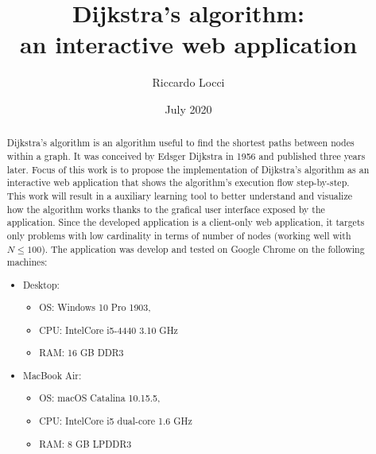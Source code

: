 \documentclass[9pt]{extarticle}
\title{Dijkstra's algorithm: \\ an interactive web application}
\date{July 2020}
\author{Riccardo Locci}
\begin{document}
    \maketitle
        
    \begin{abstract} 
        Dijkstra's algorithm is an algorithm useful to find the shortest paths between nodes within a graph. 
        It was conceived by Edsger Dijkstra in 1956 and published three years later.\cite{wiki:dijkstra} 
        Focus of this work is to propose the implementation of Dijkstra's algorithm as an interactive web application
        that shows the algorithm's execution flow step-by-step.
        This work will result in a auxiliary learning tool to better understand and visualize how the algorithm works
        thanks to the grafical user interface exposed by the application.
        Since the developed application is a client-only web application, it targets only problems with low cardinality
        in terms of number of nodes (working well with $N \leq 100$).
        The application was develop and tested on Google Chrome on the following machines:
        
        \begin{itemize}
            \item Desktop:
            \begin{itemize} 
                \item OS: Windows 10 Pro 1903, 
                \item CPU: Intel\textregistered Core i5-4440 3.10 GHz
                \item RAM: 16 GB DDR3 
            \end{itemize}
            \item MacBook Air:
            \begin{itemize} 
                \item OS: macOS Catalina 10.15.5, 
                \item CPU: Intel\textregistered Core i5 dual-core 1.6 GHz
                \item RAM: 8 GB LPDDR3 
            \end{itemize}
        \end{itemize}
    \end{abstract}
\end{document}
